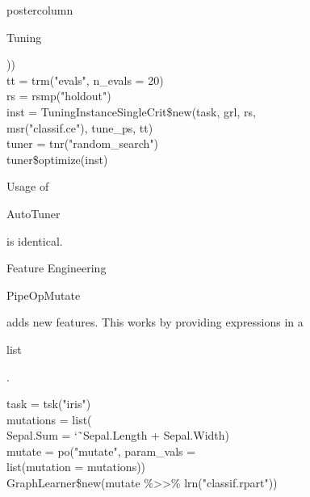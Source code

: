 \documentclass{beamer}
\newcommand{\codeinline}[1]{\begin{codeboxinline}#1\end{codeboxinline}}
\begin{document}
\begin{frame}[fragile]{}
\begin{columns}
\begin{column}{.245\textwidth}
\begin{beamercolorbox}[center]{postercolumn}
\begin{minipage}{.98\textwidth}
{\begin{myblock}{Tuning}
\begin{codeboxexample}
{                ))\\
                tt = trm("evals", n\_evals = 20)\\
                rs = rsmp("holdout")\\
                inst = TuningInstanceSingleCrit\$new(task, grl, rs,\\
                \hspace*{1ex} msr("classif.ce"), tune\_ps, tt)\\
                tuner = tnr("random\_search")\\
                tuner\$optimize(inst)
                }
              \end{codeboxexample}
              \vspace{1.0em}
              Usage of \codeinline{AutoTuner} is identical.
            \end{myblock}
            \vspace{-1.0em}
            \begin{myblock}{Feature Engineering}
              \codeinline{PipeOpMutate} adds new features.
              This works by providing expressions in a \codeinline{list}.
              \\
              \begin{codeboxexample}
                \footnotesize{
                task = tsk("iris")\\
                mutations = list(\\
                \hspace*{1ex} Sepal.Sum = \char`\~ \ Sepal.Length + Sepal.Width)\\
                mutate = po("mutate", param\_vals =\\
                \hspace*{1ex} list(mutation = mutations))\\
                GraphLearner\$new(mutate \%>{}>\% lrn("classif.rpart"))
                }
              \end{codeboxexample}

\end{myblock}}
\end{minipage}
\end{beamercolorbox}
\end{column}
\end{columns}
\end{frame}
\end{document}
